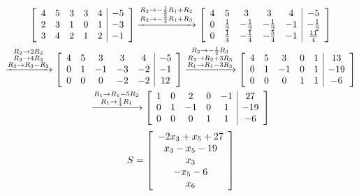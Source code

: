 \documentclass[11pt]{homework}
\begin{document}
    \begin{multline}
        \left[\begin{array}{ccccc|c}
            4 & 5 & 3 & 3 & 4 & -5 \\ 
            2 & 3 & 1 & 0 & 1 & -3 \\ 
            3 & 4 & 2 & 1 & 2 & -1
            \end{array}\right]
        \xrightarrow{\substack{R_{2}\to-\frac{1}{2}R_{1}+R_{2}\\R_{3}\to-\frac{3}{4}R_{1}+R_{3}}}
        \left[\begin{array}{ccccc|c}
        4 & 5 & 3 & 3 & 4 & -5 \\ 
        0 & \frac{1}{2} & -\frac{1}{2} & -\frac{1}{2} & -1 & -\frac{1}{2} \\ 
        0 & \frac{1}{4} & -\frac{1}{4} & -\frac{5}{4} & -1 & \frac{11}{4}
        \end{array}\right]\\
        \xrightarrow{\substack{R_{2}\to2R_{2}\\R_{3}\to4R_{3}\\R_{3}\to R_{3}-R_{2}}}
        \left[\begin{array}{ccccc|c}
        4 & 5 & 3 & 3 & 4 & -5 \\ 
        0 & 1 & -1 & -3 & -2 & -1 \\ 
        0 & 0 & 0 & -2 & -2 & 12
        \end{array}\right]
        \xrightarrow{\substack{R_{3}\to-\frac{1}{2}R_{3}\\
        R_{2}\to R_{2}+3R_{3}\\
        R_{1}\to R_{1}-3R_{3}}}
        \left[\begin{array}{ccccc|c}
        4 & 5 & 3 & 0 & 1 & 13 \\ 
        0 & 1 & -1 & 0 & 1 & -19 \\ 
        0 & 0 & 0 & 1 & 1 & -6
        \end{array}\right]\\
        \xrightarrow{\substack{R_{1}\to R_{1}-5R_{2}\\
        R_{1}\to\frac{1}{4}R_{1}}}
        \left[\begin{array}{ccccc|c}
        1 & 0 & 2 & 0 & -1 & 27 \\ 
        0 & 1 & -1 & 0 & 1 & -19 \\ 
        0 & 0 & 0 & 1 & 1 & -6
        \end{array}\right]
    \end{multline}
    \begin{equation}
        S=
        \left[\begin{array}{c}
        -2x_{3}+x_{5}+27 \\ 
        x_{3}-x_{5}-19 \\ 
        x_{3} \\ 
        -x_{5}-6 \\ 
        x_{6}
        \end{array}\right]
    \end{equation}



    \question
    
\end{document}
